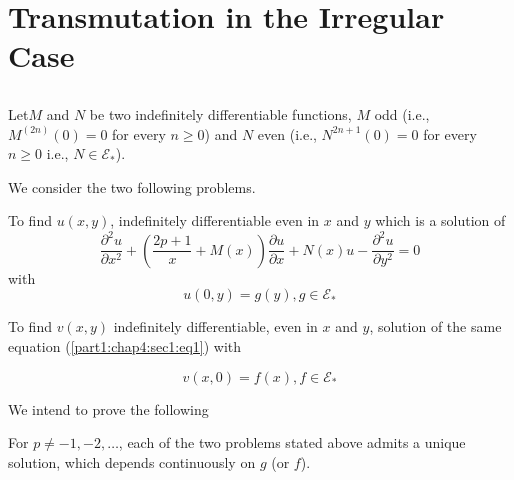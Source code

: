 
 \chapter{Transmutation in the Irregular Case}\label{part1:chap4}%
 
  
\section{}\label{part1:chap4:sec1}%
 
Let\pageoriginale $M$ and $N$ be two indefinitely differentiable functions, $M$ odd
(i.e., $M^{(2n)} (0) = 0$ for every $n \geq 0$) and $N$ even
(i.e., $N^{2n+1}(0) = 0$ for every $n \geq 0$ i.e., $N \in
\mathscr{E}_*$). 
 
We consider the two following problems. 

\setcounter{prob}{0}
\begin{prob}\label{part1:chap4:sec1:prob1}%
  To find $u (x, y)$, indefinitely differentiable even in $x$ and $y$
  which is a solution of  
  \begin{equation*} 
    \frac{\partial^2 u}{\partial x^2} + \left(\frac{2p+1}{x} + M(x)\right)
    \frac{\partial u}{\partial x} + N(x) u - \frac{\partial^2
      u}{\partial y^2} = 0 \tag{1}\label{part1:chap4:sec1:eq1} 
  \end{equation*}
with
\begin{equation*}
    u(0, y) = g(y), g \in \mathscr{E}_* \tag{2}\label{part1:chap4:sec1:eq2}
\end{equation*}
\end{prob}

\begin{prob}\label{part1:chap4:sec1:prob2}%
    To find $v(x, y)$ indefinitely differentiable, even in $x$ and
    $y$, solution of the same equation (\ref{part1:chap4:sec1:eq1}) with 
  \end{prob} 
  \begin{equation*}
    v(x, 0)= f (x), f \in \mathscr{E}_* \tag{3}\label{part1:chap4:sec1:eq3}
  \end{equation*} 

We intend to prove the following 
\begin{theorem}\label{part1:chap4:sec1:thm1}%
  For $p \neq -1, -2, \ldots$, each of the two problems stated above
  admits a unique solution, which depends continuously on $g$ (or
  $f$). 
\end{theorem} 

